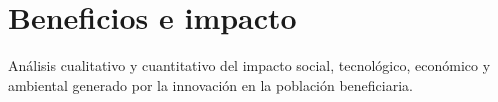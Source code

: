 \section{Beneficios e impacto}
\label{sec:beneficios_impacto}
Análisis cualitativo y cuantitativo del impacto social, tecnológico, económico y ambiental generado por la innovación en la población beneficiaria.
